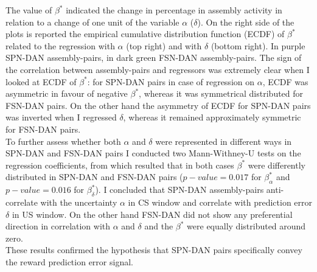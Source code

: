 The value of $\beta^*$ indicated the change in percentage in assembly activity in relation to a change of one unit of the variable $\alpha$ ($\delta$). On the right side of the plots is reported the empirical cumulative distribution function (ECDF) of $\beta^*$ related to the regression with $\alpha$ (top right) and with $\delta$ (bottom right). In purple SPN-DAN assembly-pairs, in dark green FSN-DAN assembly-pairs. The sign of the correlation between assembly-pairs and regressors was extremely clear when I looked at ECDF of $\beta^*$: for SPN-DAN pairs in case of regression on $\alpha$, ECDF was asymmetric in favour of negative $\beta^*$, whereas it was symmetrical distributed for FSN-DAN pairs. On the other hand the asymmetry of ECDF for SPN-DAN pairs was inverted when I regressed $\delta$, whereas it remained approximately symmetric for FSN-DAN pairs.\\To further assess whether both $\alpha$ and $\delta$ were represented in different ways in SPN-DAN and FSN-DAN pairs I conducted two Mann-Withney-U tests on the regression coefficients, from which resulted that in both cases $\beta^*$ were differently distributed in SPN-DAN and FSN-DAN pairs ($p-value=0.017$ for $\beta^*_{\alpha}$ and $p-value=0.016$ for $\beta^*_{\delta}$). I concluded that SPN-DAN assembly-pairs anti-correlate with the uncertainty $\alpha$ in CS window and correlate with prediction error $\delta$ in US window. On the other hand FSN-DAN did not show any preferential direction in correlation with $\alpha$ and $\delta$ and the $\beta^*$ were equally distributed around zero.\\These results confirmed the hypothesis that SPN-DAN pairs specifically convey the reward prediction error signal.
